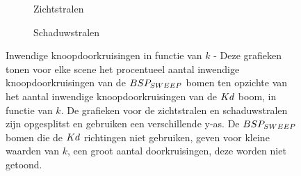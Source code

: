 \begin{figure}
  \centering
  \begin{subfigure}{\linewidth}
  \centering
  \begin{subfigure}[t]{.32\linewidth}
    \centering
{}
  \end{subfigure}
  \begin{subfigure}[t]{.32\linewidth}
    \centering
{}
\end{subfigure}
\begin{subfigure}[t]{.32\linewidth}
  \centering
{}
\end{subfigure}
\caption{Zichtstralen}
\end{subfigure}
  \begin{subfigure}{\linewidth}
  \centering
  \begin{subfigure}[t]{.32\linewidth}
    \centering
{}
  \end{subfigure}
  \begin{subfigure}[t]{.32\linewidth}
    \centering
{}
\end{subfigure}
\begin{subfigure}[t]{.32\linewidth}
  \centering
{}
\end{subfigure}
\caption{Schaduwstralen}
\end{subfigure}
\caption[Inwendige knoopdoorkruisingen in functie van $k$]{Inwendige knoopdoorkruisingen in functie van $k$ - \small Deze grafieken tonen voor elke scene het procentueel aantal inwendige knoopdoorkruisingen van de $BSP_{SWEEP}$ bomen ten opzichte van het aantal inwendige knoopdoorkruisingen van de $Kd$ boom, in functie van $k$. De grafieken voor de zichtstralen en schaduwstralen zijn opgesplitst en gebruiken een verschillende y-as. De $BSP_{SWEEP}$ bomen die de $Kd$ richtingen niet gebruiken, geven voor kleine waarden van $k$, een groot aantal doorkruisingen, deze worden niet getoond.}
\label{fig:k-doorkruisingen}
\end{figure}



